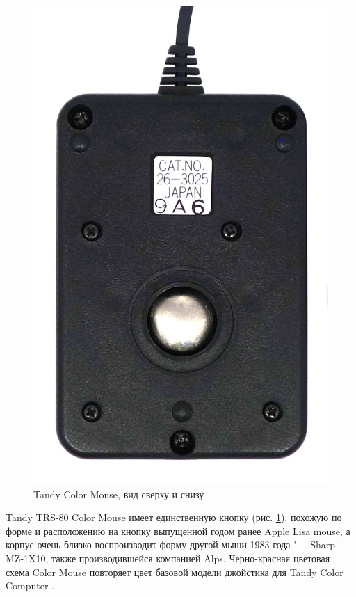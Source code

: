 \documentclass[11pt, a4paper]{article}
\begin{document}
\begin{figure}[h]
    \includegraphics[scale=0.55]{1984_tandy_trs80_color_mouse/bottom_60.jpg}
    \caption{Tandy Color Mouse, вид сверху и снизу}
    \label{fig:TandyColorMouseTopAndBottom}
\end{figure}

Tandy TRS-80 Color Mouse имеет единственную кнопку (рис. \ref{fig:TandyColorMouseTopAndBottom}), похожую по форме и расположению на кнопку выпущенной годом ранее Apple Lisa mouse, а корпус очень близко воспроизводит форму другой мыши 1983 года "--- Sharp MZ-1X10, также производившейся компанией Alps. Черно-красная цветовая схема Color Mouse повторяет цвет базовой модели джойстика для Tandy Color Computer \cite{hierophant}.
\end{document}

